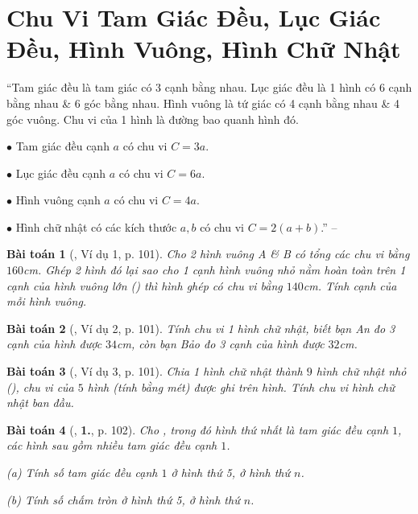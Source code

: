 \documentclass{article}
\numberwithin{equation}{section}
\newtheorem{baitoan}{Bài toán}[section]
\begin{document}
\section{Chu Vi Tam Giác Đều, Lục Giác Đều, Hình Vuông, Hình Chữ Nhật}
``Tam giác đều là tam giác có 3 cạnh bằng nhau. Lục giác đều là 1 hình có 6 cạnh bằng nhau \& 6 góc bằng nhau. Hình vuông là tứ giác có 4 cạnh bằng nhau \& 4 góc vuông. Chu vi của 1 hình là đường bao quanh hình đó.
\begin{enumerate*}
	\item[$\bullet$] Tam giác đều cạnh $a$ có chu vi $C = 3a$.
	\item[$\bullet$] Lục giác đều cạnh $a$ có chu vi $C = 6a$.
	\item[$\bullet$] Hình vuông cạnh $a$ có chu vi $C = 4a$.
	\item[$\bullet$] Hình chữ nhật có các kích thước $a,b$ có chu vi $C = 2(a + b)$.'' -- \cite[p. 101]{Binh_Toan_6_tap_1}
\end{enumerate*}

\begin{baitoan}[\cite{Binh_Toan_6_tap_1}, Ví dụ 1, p. 101]
	Cho 2 hình vuông A \& B có tổng các chu vi bằng $160$\emph{cm}. Ghép 2 hình đó lại sao cho 1 cạnh hình vuông nhỏ nằm hoàn toàn trên 1 cạnh của hình vuông lớn (\cite[Hình 18, p. 101]{Binh_Toan_6_tap_1}) thì hình ghép có chu vi bằng $140$\emph{cm}. Tính cạnh của mỗi hình vuông.
\end{baitoan}

\begin{baitoan}[\cite{Binh_Toan_6_tap_1}, Ví dụ 2, p. 101]
	Tính chu vi 1 hình chữ nhật, biết bạn An đo 3 cạnh của hình được $34$\emph{cm}, còn bạn Bảo đo 3 cạnh của hình được $32$\emph{cm}.
\end{baitoan}

\begin{baitoan}[\cite{Binh_Toan_6_tap_1}, Ví dụ 3, p. 101]
	Chia 1 hình chữ nhật thành $9$ hình chữ nhật nhỏ (\cite[Hình 19, p. 101]{Binh_Toan_6_tap_1}), chu vi của $5$ hình (tính bằng mét) được ghi trên hình. Tính chu vi hình chữ nhật ban đầu.
\end{baitoan}

\begin{baitoan}[\cite{Binh_Toan_6_tap_1}, \textbf{1.}, p. 102]
	Cho \cite[Hình 20, p. 101]{Binh_Toan_6_tap_1}, trong đó hình thứ nhất là tam giác đều cạnh $1$, các hình sau gồm nhiều tam giác đều cạnh $1$.
	\begin{enumerate*}
		\item[(a)] Tính số tam giác đều cạnh $1$ ở hình thứ 5, ở hình thứ $n$.
		\item[(b)] Tính số chấm tròn ở hình thứ 5, ở hình thứ $n$.
	\end{enumerate*}
\end{baitoan}
\end{document}
